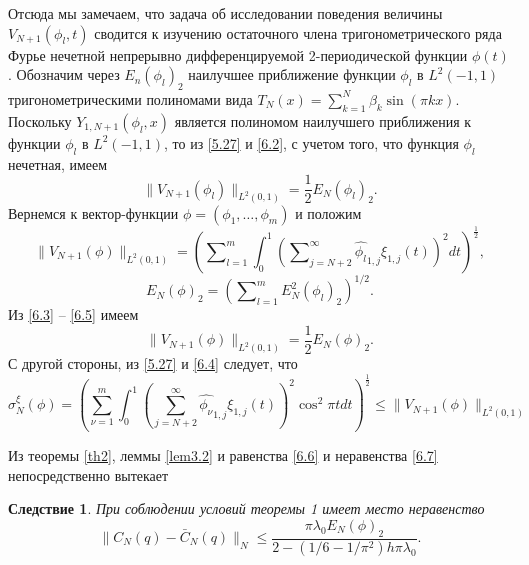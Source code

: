 \documentclass{article}
\numberwithin{equation}{section}
\theoremstyle{plain}
\newtheorem{corollary}{Следствие}
\theoremstyle{definition}
\begin{document}
\begin{fulltext}
Отсюда мы замечаем, что задача об исследовании поведения величины \linebreak $V_{N+1}(\phi_l,t)$ сводится к изучению остаточного члена тригонометрического ряда Фурье нечетной непрерывно дифференцируемой 2-периодической функции $\phi(t)$.
Обозначим через $E_n(\phi_l)_2$ наилучшее приближение функции $\phi_l$ в $L^2(-1,1)$ тригонометрическими полиномами вида $T_N(x)=\sum_{k=1}^{N}\beta_k\sin(\pi kx)$. Поскольку $Y_{1,N+1}(\phi_l,x)$ является полиномом наилучшего приближения к функции $\phi_l$ в $L^2(-1,1)$, то из \eqref{5.27} и  \eqref{6.2}, с учетом того, что функция $\phi_l$ нечетная, имеем
\begin{equation}\label{6.3}
\|V_{N+1}(\phi_l)\|_{L^2(0,1)}=\frac12E_{N}(\phi_l)_2.
\end{equation}
Вернемся к вектор-функции $\phi=(\phi_1,\ldots,\phi_m)$ и положим
\begin{equation}\label{6.4}
\|V_{N+1}(\phi)\|_{L^2(0,1)}=\left(\sum\nolimits_{l=1}^m\int_{0}^1\left(\sum\nolimits_{j=N+2}^\infty \widehat {\phi_l}_{1,j}\xi_{1,j}(t)\right)^2 dt\right)^\frac12,
\end{equation}
\begin{equation}\label{6.5}
    E_{N}(\phi)_2=\left(\sum\nolimits_{l=1}^mE^2_{N}(\phi_l)_2\right)^{1/2}.
\end{equation}
Из \eqref{6.3} -- \eqref{6.5} имеем
\begin{equation}\label{6.6}
\|V_{N+1}(\phi)\|_{L^2(0,1)}=\frac12E_{N}(\phi)_2.
\end{equation}
С другой стороны, из \eqref{5.27} и \eqref{6.4} следует, что
\begin{equation}\label{6.7}
\sigma_N^\xi(\phi)=\left(\sum_{\nu=1}^m\int_{0}^1\left(\sum_{j=N+2}^\infty \widehat {\phi_\nu}_{1,j}\xi_{1,j}(t)\right)^2\cos^2\pi t dt\right)^\frac12\le \|V_{N+1}(\phi)\|_{L^2(0,1)}
\end{equation}



Из теоремы \ref{th2}, леммы \ref{lem3.2} и равенства \eqref{6.6} и неравенства \eqref{6.7}  непосредственно вытекает
\begin{corollary}\label{cor1}
  При соблюдении условий теоремы 1 имеет место неравенство
  \begin{equation}\label{6.8}
\|C_N(q)-\bar C_N(q)\|_N\le \frac{\pi\lambda_0 E_{N}(\phi)_2} {2-(1/6-1/\pi^2)h\pi\lambda_0}.
\end{equation}
\end{corollary}


\end{fulltext}
\end{document}
